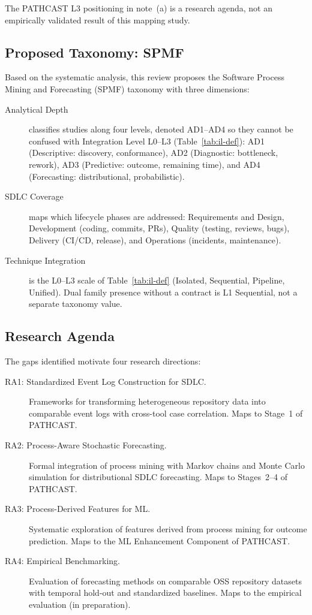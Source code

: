 The PATHCAST L3 positioning in note~(a) is a research agenda, not an
empirically validated result of this mapping study.


\subsection{Proposed Taxonomy: SPMF}
\label{sec:slr-taxonomy}

Based on the systematic analysis, this review proposes the Software Process
Mining and Forecasting (SPMF) taxonomy with three dimensions:

\begin{description}
\item[Analytical Depth] classifies studies along four levels, denoted
  AD1--AD4 so they cannot be confused with Integration Level
  L0--L3 (Table~\ref{tab:il-def}): AD1
  (Descriptive: discovery, conformance), AD2 (Diagnostic: bottleneck, rework),
  AD3 (Predictive: outcome, remaining time), and AD4 (Forecasting:
  distributional, probabilistic).

\item[SDLC Coverage] maps which lifecycle phases are addressed: Requirements
  and Design, Development (coding, commits, PRs), Quality (testing, reviews,
  bugs), Delivery (CI/CD, release), and Operations (incidents, maintenance).

\item[Technique Integration] is the L0--L3 scale of Table~\ref{tab:il-def}
  (Isolated, Sequential, Pipeline, Unified). Dual family presence without a
  contract is L1 Sequential, not a separate taxonomy value.
\end{description}


\subsection{Research Agenda}
\label{sec:slr-agenda}

The gaps identified motivate four research directions:

\begin{description}
\item[RA1: Standardized Event Log Construction for SDLC.]
  Frameworks for transforming heterogeneous repository data into comparable
  event logs with cross-tool case correlation. Maps to Stage~1 of PATHCAST.

\item[RA2: Process-Aware Stochastic Forecasting.]
  Formal integration of process mining with Markov chains and Monte Carlo
  simulation for distributional SDLC forecasting. Maps to Stages~2--4 of
  PATHCAST.

\item[RA3: Process-Derived Features for ML.]
  Systematic exploration of features derived from process mining for outcome
  prediction. Maps to the ML Enhancement Component of PATHCAST.

\item[RA4: Empirical Benchmarking.]
  Evaluation of forecasting methods on comparable OSS repository datasets with
  temporal hold-out and standardized baselines. Maps to the empirical
  evaluation (in preparation).
\end{description}


